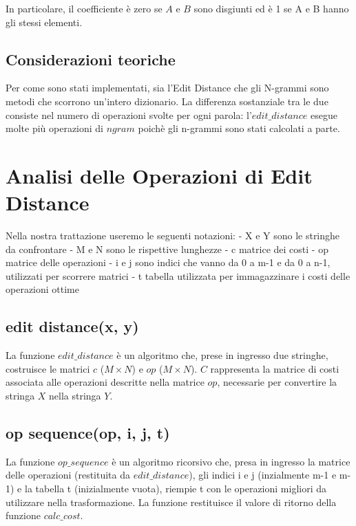 \documentclass[a4paper,12pt]{article}
\begin{document}
In particolare, il coefficiente è zero se $A$ e $B$ sono disgiunti ed è 1 se A e B hanno gli stessi elementi.

\subsection{Considerazioni teoriche}
Per come sono stati implementati, sia l'Edit Distance che gli N-grammi sono metodi che scorrono un'intero dizionario.
La differenza sostanziale tra le due consiste nel numero di operazioni svolte per ogni parola: l'$edit\_distance$ esegue molte più operazioni di $ngram$ poichè gli n-grammi sono stati calcolati a parte.

\clearpage
\section{Analisi delle Operazioni di Edit Distance}

Nella nostra trattazione useremo le seguenti notazioni:
\newline
- X e Y sono le stringhe da confrontare \newline
- M e N sono le rispettive lunghezze \newline
- c matrice dei costi \newline
- op matrice delle operazioni \newline
- i e j sono indici che vanno da 0 a m-1 e da 0 a n-1, utilizzati per scorrere matrici \newline
- t tabella utilizzata per immagazzinare i costi delle operazioni ottime

\subsection{edit distance(x, y)}
La funzione $edit\_distance$ è un algoritmo che, prese in ingresso due stringhe, costruisce le matrici $c$ ($M \times N$) e $op$ ($M \times N$). $C$ rappresenta la matrice di costi associata alle operazioni descritte nella matrice $op$, necessarie per convertire la stringa $X$ nella stringa $Y$.

\subsection{op sequence(op, i, j, t)}
La funzione $op\_sequence$ è un algoritmo ricorsivo che, presa in ingresso la matrice delle operazioni (restituita da $edit\_distance$), gli indici i e j (inzialmente m-1 e m-1) e la tabella t (inizialmente vuota), riempie t con le operazioni migliori da utilizzare nella trasformazione.
La funzione restituisce il valore di ritorno della funzione $calc\_cost$.
\end{document}
